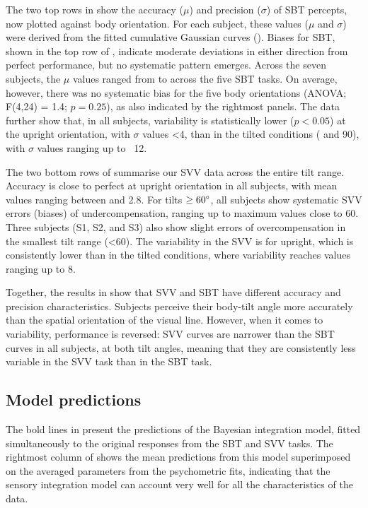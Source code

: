 The two top rows in  show the accuracy ($\mu$) and precision ($\sigma$) of SBT percepts, now plotted against body orientation. For each subject, these values ($\mu$ and $\sigma$) were derived from the fitted cumulative Gaussian curves (). Biases for SBT, shown in the top row of , indicate moderate deviations in either direction from perfect performance, but no systematic pattern emerges. Across the seven subjects, the $\mu$ values ranged from  to  across the five SBT tasks. On average, however, there was no systematic bias for the five body orientations (ANOVA; F(4,24) = 1.4; $p = 0.25$), as also indicated by the rightmost panels. The data further show that, in all subjects, variability is statistically lower ($p < 0.05$) at the upright orientation, with $\sigma$ values \textless4\textdegree, than in the tilted conditions ( and 90\textdegree), with $\sigma$ values ranging up to ~12\textdegree. 

The two bottom rows of  summarise our SVV data across the entire tilt range. Accuracy is close to perfect at upright orientation in all subjects, with mean values ranging between  and 2.8\textdegree. For tilts $\ge60\degree$, all subjects show systematic SVV errors (biases) of undercompensation, ranging up to maximum values close to 60\textdegree. Three subjects (S1, S2, and S3) also show slight errors of overcompensation in the smallest tilt range (\textless60\textdegree). The variability in the SVV is  for upright, which is consistently lower than in the tilted conditions, where variability reaches values ranging up to 8\textdegree. 

Together, the results in  show that SVV and SBT have different accuracy and precision characteristics. Subjects perceive their body-tilt angle more accurately than the spatial orientation of the visual line. However, when it comes to variability, performance is reversed: SVV curves are narrower than the SBT curves in all subjects, at both tilt angles, meaning that they are consistently less variable in the SVV task than in the SBT task. 

\subsection{Model predictions}

The bold lines in  present the predictions of the Bayesian integration model, fitted simultaneously to the original responses from the SBT and SVV tasks. The rightmost column of  shows the mean predictions from this model superimposed on the averaged parameters from the psychometric fits, indicating that the sensory integration model can account very well for all the characteristics of the data. 

